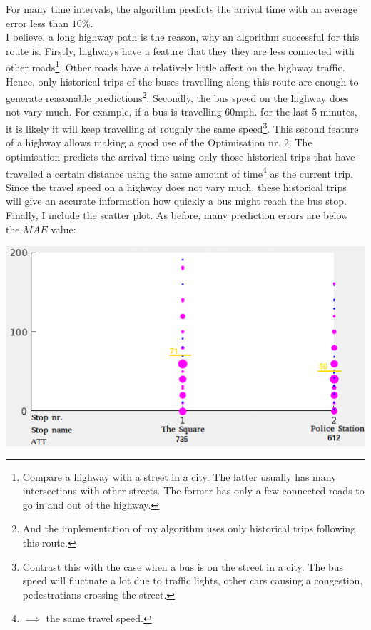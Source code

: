 \documentclass[12pt,a4paper,oneside,openright]{report}
\begin{document}
For many time intervals, the algorithm predicts the arrival time with an average error
less than $10\%$. \\

I believe, a long highway path is the reason, why an algorithm successful for this route is.
Firstly, highways have a feature that they they are less connected with other
roads\footnote{Compare a highway with a street in a city. The latter usually has many
intersections with other streets. The former has only a few connected roads to go in and out
of the highway.}. Other roads have a relatively little affect on the highway traffic.
Hence, only historical trips of the buses travelling along this route are enough to generate
reasonable predictions\footnote{And the implementation of my algorithm uses only historical trips
following this route.}. Secondly, the bus speed on the highway does not vary
much. For example, if a bus is travelling $60$mph. for the last 5 minutes, it is likely
it will keep travelling at roughly the same speed\footnote{Contrast this with the case when a bus
is on the street in a city. The bus speed will fluctuate a lot due to traffic lights, other
cars causing a congestion, pedestratians crossing the street.}. This second feature of a highway allows making a good use of the
Optimisation nr. 2. The optimisation predicts the arrival time using only those historical
trips that have travelled a certain distance using the same amount of time\footnote{$\implies$
the same travel speed.} as the current trip. Since the travel speed on a highway does not vary
much, these historical trips will give an accurate information how quickly a bus might reach
the bus stop. \\

Finally, I include the scatter plot. As before, many prediction errors are below the $MAE$ value:

\includegraphics[scale=0.5]{figs/best_scatter_plot.png}
\end{document}
